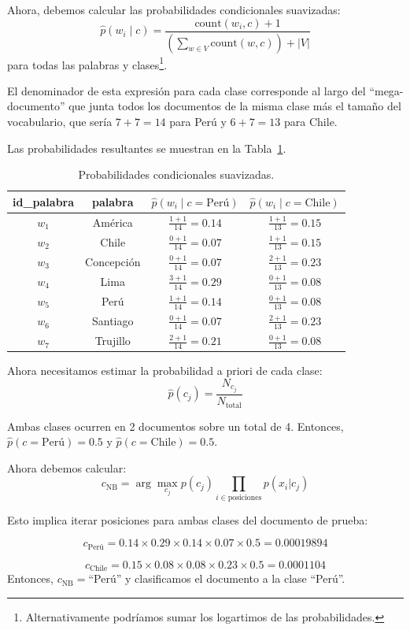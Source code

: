 \begin{example}
Ahora, debemos calcular las probabilidades condicionales suavizadas:
\[
\hat{p}(w_i \mid c) = \frac{\text{count}(w_i, c) + 1}{\left(\sum_{w \in V} \text{count}(w, c)\right) + |V|}
\]
para todas las palabras y clases\footnote{Alternativamente podríamos sumar los logartimos de las probabilidades.}.

El denominador de esta expresión para cada clase corresponde al largo del ``mega-documento'' que junta todos los documentos de la misma clase más el tamaño del vocabulario, que sería $7+7=14$ para Perú y $6+7=13$ para Chile.

Las probabilidades resultantes se muestran en la Tabla~\ref{tab_nb_probs}.

\begin{table}[h]
\centering
\begin{tabular}{|c|c|c|c|}
\hline
id\_palabra & palabra & $\hat{p}(w_i \mid c=\text{Perú})$ & $\hat{p}(w_i \mid c=\text{Chile})$ \\
\hline
$w_1$ & América & $\frac{1+1}{14}=0.14$ & $\frac{1+1}{13}=0.15$ \\
$w_2$ & Chile & $\frac{0+1}{14}=0.07$ & $\frac{1+1}{13}=0.15$ \\
$w_3$ & Concepción & $\frac{0+1}{14}=0.07$ & $\frac{2+1}{13}=0.23$ \\
$w_4$ & Lima & $\frac{3+1}{14}=0.29$ & $\frac{0+1}{13}=0.08$ \\
$w_5$ & Perú & $\frac{1+1}{14}=0.14$ & $\frac{0+1}{13}=0.08$ \\
$w_6$ & Santiago & $\frac{0+1}{14}=0.07$ & $\frac{2+1}{13}=0.23$ \\
$w_7$ & Trujillo & $\frac{2+1}{14}=0.21$ & $\frac{0+1}{13}=0.08$ \\
\hline
\end{tabular}
\caption{Probabilidades condicionales suavizadas.}
\label{tab_nb_probs}
\end{table}

Ahora necesitamos estimar la probabilidad a priori de cada clase:
    \[
    \hat{p}(c_j) = \frac{N_{c_j}}{N_{\text{total}}}
    \]

Ambas clases ocurren en 2 documentos sobre un total de 4. Entonces, $\hat{p}(c=\text{Perú})=0.5$ y $\hat{p}(c=\text{Chile})=0.5$.

Ahora debemos calcular:
\[
c_{\text{NB}} = \arg\max_{c_j} p(c_j) \prod_{i \in \text{posiciones}} p(x_i | c_j)
\]

Esto implica iterar posiciones para ambas clases del documento de prueba:

\[
c_{\text{Perú}} = 0.14\times 0.29\times 0.14\times 0.07\times 0.5=0.00019894
\]

\[
c_{\text{Chile}} = 0.15\times 0.08\times 0.08\times 0.23\times 0.5=0.0001104
\]
Entonces, $c_{\text{NB}}=$``Perú'' y clasificamos el documento a la clase ``Perú''.
\end{example}



